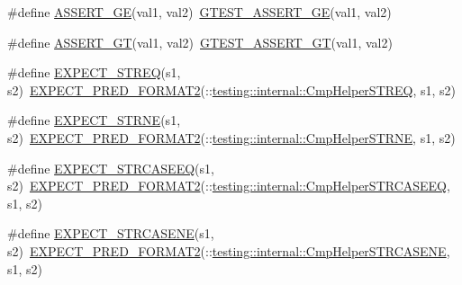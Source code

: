 \begin{DoxyCompactItemize}
\#define \mbox{\hyperlink{googletest-master_2googletest_2include_2gtest_2gtest_8h_af4ff5dc71479fcb374b6bc2ed195bcc4}{A\+S\+S\+E\+R\+T\+\_\+\+GE}}(val1,  val2)~\mbox{\hyperlink{_obj__test_2lib_2googletest-release-1_88_81_2googletest_2include_2gtest_2gtest_8h_a55373d99c079ff1b894e2eb5bcd15c5a}{G\+T\+E\+S\+T\+\_\+\+A\+S\+S\+E\+R\+T\+\_\+\+GE}}(val1, val2)
\item 
\#define \mbox{\hyperlink{googletest-master_2googletest_2include_2gtest_2gtest_8h_a16a882d4eafc9f8643867aea40879140}{A\+S\+S\+E\+R\+T\+\_\+\+GT}}(val1,  val2)~\mbox{\hyperlink{_obj__test_2lib_2googletest-release-1_88_81_2googletest_2include_2gtest_2gtest_8h_a088b9056fd1c1f316b41c22f64deb33a}{G\+T\+E\+S\+T\+\_\+\+A\+S\+S\+E\+R\+T\+\_\+\+GT}}(val1, val2)
\item 
\#define \mbox{\hyperlink{googletest-master_2googletest_2include_2gtest_2gtest_8h_ad20f7b94ac5081e16f0005b94e95f0c6}{E\+X\+P\+E\+C\+T\+\_\+\+S\+T\+R\+EQ}}(s1,  s2)~\mbox{\hyperlink{_obj__test_2lib_2googletest-release-1_88_81_2googletest_2include_2gtest_2gtest__pred__impl_8h_af0141918615a5e2d5247e9cda8324dae}{E\+X\+P\+E\+C\+T\+\_\+\+P\+R\+E\+D\+\_\+\+F\+O\+R\+M\+A\+T2}}(\+::\mbox{\hyperlink{namespacetesting_1_1internal_a711a396ed8f636ecd14a850a89d181b6}{testing\+::internal\+::\+Cmp\+Helper\+S\+T\+R\+EQ}}, s1, s2)
\item 
\#define \mbox{\hyperlink{googletest-master_2googletest_2include_2gtest_2gtest_8h_aee7e9c42f55549dbc0dfc42391eb9775}{E\+X\+P\+E\+C\+T\+\_\+\+S\+T\+R\+NE}}(s1,  s2)~\mbox{\hyperlink{_obj__test_2lib_2googletest-release-1_88_81_2googletest_2include_2gtest_2gtest__pred__impl_8h_af0141918615a5e2d5247e9cda8324dae}{E\+X\+P\+E\+C\+T\+\_\+\+P\+R\+E\+D\+\_\+\+F\+O\+R\+M\+A\+T2}}(\+::\mbox{\hyperlink{namespacetesting_1_1internal_af2d31c77ce73e1003a64bd7ca3564bbe}{testing\+::internal\+::\+Cmp\+Helper\+S\+T\+R\+NE}}, s1, s2)
\item 
\#define \mbox{\hyperlink{googletest-master_2googletest_2include_2gtest_2gtest_8h_a740cab7e3eec5c178a64b4f558bde66e}{E\+X\+P\+E\+C\+T\+\_\+\+S\+T\+R\+C\+A\+S\+E\+EQ}}(s1,  s2)~\mbox{\hyperlink{_obj__test_2lib_2googletest-release-1_88_81_2googletest_2include_2gtest_2gtest__pred__impl_8h_af0141918615a5e2d5247e9cda8324dae}{E\+X\+P\+E\+C\+T\+\_\+\+P\+R\+E\+D\+\_\+\+F\+O\+R\+M\+A\+T2}}(\+::\mbox{\hyperlink{namespacetesting_1_1internal_a30dfeb01f1bc8087c7d05205d5fa75c1}{testing\+::internal\+::\+Cmp\+Helper\+S\+T\+R\+C\+A\+S\+E\+EQ}}, s1, s2)
\item 
\#define \mbox{\hyperlink{googletest-master_2googletest_2include_2gtest_2gtest_8h_a07d0b5cbd3b5f7c8b6f44c609046ff07}{E\+X\+P\+E\+C\+T\+\_\+\+S\+T\+R\+C\+A\+S\+E\+NE}}(s1,  s2)~\mbox{\hyperlink{_obj__test_2lib_2googletest-release-1_88_81_2googletest_2include_2gtest_2gtest__pred__impl_8h_af0141918615a5e2d5247e9cda8324dae}{E\+X\+P\+E\+C\+T\+\_\+\+P\+R\+E\+D\+\_\+\+F\+O\+R\+M\+A\+T2}}(\+::\mbox{\hyperlink{namespacetesting_1_1internal_a7e31d489f06ab8f6a81a7729f0c377e7}{testing\+::internal\+::\+Cmp\+Helper\+S\+T\+R\+C\+A\+S\+E\+NE}}, s1, s2)

\end{DoxyCompactItemize}
